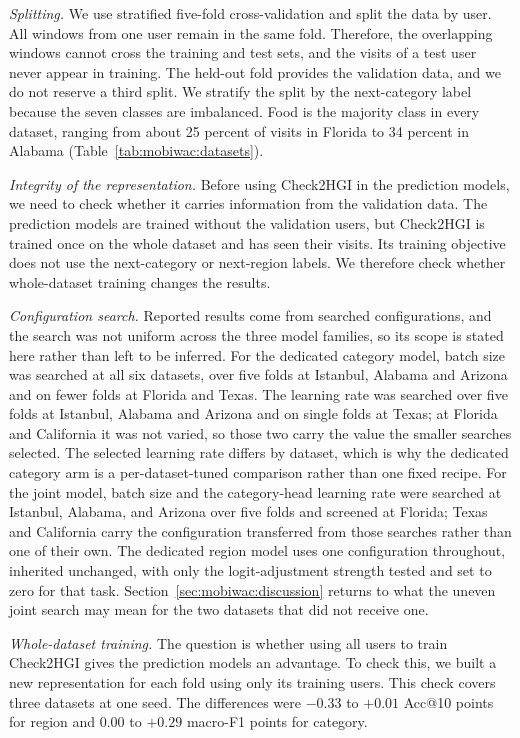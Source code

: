 \emph{Splitting.} We use stratified five-fold cross-validation and split the data by user. All windows from one user remain in the same fold. Therefore, the overlapping windows cannot cross the training and test sets, and the visits of a test user never appear in training. The held-out fold provides the validation data, and we do not reserve a third split. We stratify the split by the next-category label because the seven classes are imbalanced. Food is the majority class in every dataset, ranging from about 25 percent of visits in Florida to 34 percent in Alabama (Table~\ref{tab:mobiwac:datasets}).

\emph{Integrity of the representation.} Before using Check2HGI in the prediction
models, we need to check whether it carries information from the validation data. The
prediction models are trained without the validation users, but Check2HGI is trained
once on the whole dataset and has seen their visits. Its training objective does not
use the next-category or next-region labels. We therefore check whether whole-dataset
training changes the results.

\emph{Configuration search.} Reported results come from searched configurations, and the search
was not uniform across the three model families, so its scope is stated here rather than left to
be inferred.
For the dedicated category model, batch size was searched at all six datasets, over five folds at
Istanbul, Alabama and Arizona and on fewer folds at Florida and Texas. The learning rate was
searched over five folds at Istanbul, Alabama and Arizona and on single folds at Texas; at Florida
and California it was not varied, so those two carry the value the smaller searches selected.
The selected learning rate differs by dataset, which is
why the dedicated category arm is a per-dataset-tuned comparison rather than one fixed recipe. For
the joint model, batch size and the category-head learning rate were searched at Istanbul, Alabama,
and Arizona over five folds and screened at Florida; Texas and California carry the configuration
transferred from those searches rather than one of their own. The dedicated region model uses one
configuration throughout, inherited unchanged, with only the logit-adjustment strength tested and
set to zero for that task. Section~\ref{sec:mobiwac:discussion} returns to what the uneven joint
search may mean for the two datasets that did not receive one.

\emph{Whole-dataset training.} The question is whether using all users to train
Check2HGI gives the prediction models an advantage. To check this, we built a new
representation for each fold using only its training users. This check covers three datasets at
one seed.
The differences were $-0.33$ to $+0.01$ Acc@10 points for region and $0.00$ to
$+0.29$ macro-F1 points for category.

